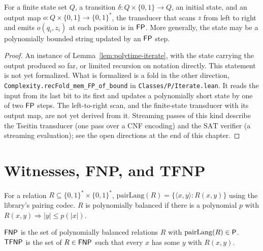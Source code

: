 \begin{lemma}
  \label{lem:polytime-fp-streaming}
  For a finite state set $Q$, a transition
  $\delta \colon Q \times \{0,1\} \to Q$, an initial state, and an output map
  $o \colon Q \times \{0,1\} \to \{0,1\}^*$, the transducer that scans $z$
  from left to right and emits $o(q_i, z_i)$ at each position is in $\mathsf{FP}$.
  More generally, the state may be a polynomially bounded string updated by an
  $\mathsf{FP}$ step.
\end{lemma}
\begin{proof}
  An instance of Lemma~\ref{lem:polytime-iterate}, with the state carrying the
  output produced so far, or limited recursion on notation directly. This
  statement is not yet formalized. What is formalized is a fold in the other
  direction, \texttt{Complexity.recFold\_mem\_FP\_of\_bound} in
  \texttt{Classes/P/Iterate.lean}. It reads the input from its last bit to its
  first and updates a polynomially short state by one of two $\mathsf{FP}$ steps.
  The left-to-right scan, and the finite-state transducer with its output map,
  are not yet derived from it. Streaming passes of this kind describe the
  Tseitin transducer (one pass over a CNF encoding) and the $\mathrm{SAT}$
  verifier (a streaming evaluation); see the open directions at the end of
  this chapter.
\end{proof}

\section{Witnesses, FNP, and TFNP}

\begin{definition}
  \label{def:pairlang}
  \leanok
  For a relation $R \subseteq \{0,1\}^* \times \{0,1\}^*$,
  $\mathrm{pairLang}(R) = \{\langle x, y \rangle : R(x, y)\}$ using the
  library's pairing codec. $R$ is polynomially balanced if there is a
  polynomial $p$ with $R(x, y) \Rightarrow |y| \le p(|x|)$.
\end{definition}

\begin{definition}
  \label{def:FNP}
  \leanok
  $\mathsf{FNP}$ is the set of polynomially balanced relations $R$ with
  $\mathrm{pairLang}(R) \in \mathsf{P}$. $\mathsf{TFNP}$ is the set of $R \in \mathsf{FNP}$
  such that every $x$ has some $y$ with $R(x, y)$.
\end{definition}

